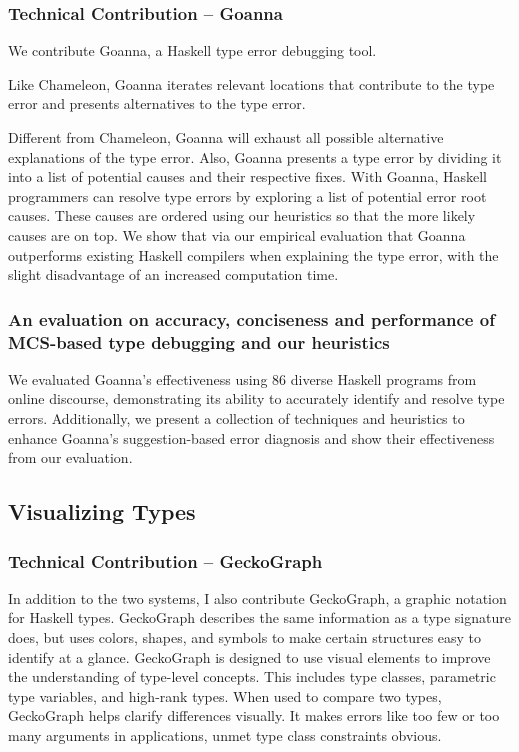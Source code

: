 \subsubsection{Technical Contribution -- Goanna}

We contribute Goanna, a Haskell type error debugging tool. 

Like Chameleon, Goanna iterates relevant locations that contribute to the type error and presents alternatives to the type error. 

Different from Chameleon, Goanna will exhaust all possible alternative explanations of the type error. Also, Goanna presents a type error by dividing it into a list of potential causes and their respective fixes. With Goanna, Haskell programmers can resolve type errors by exploring a list of potential error root causes. These causes are ordered using our heuristics so that the more likely causes are on top. We show that via our empirical evaluation that Goanna outperforms existing Haskell compilers when explaining the type error, with the slight disadvantage of an increased computation time.

\subsubsection{An evaluation on accuracy, conciseness and performance of MCS-based type debugging and our heuristics}

We evaluated Goanna's effectiveness using 86 diverse Haskell programs from online discourse, demonstrating its ability to accurately identify and resolve type errors. Additionally, we present a collection of techniques and heuristics to enhance Goanna's suggestion-based error diagnosis and show their effectiveness from our evaluation.


\subsection{Visualizing Types}

\subsubsection{Technical Contribution -- GeckoGraph}

In addition to the two systems, I also contribute GeckoGraph, a graphic notation for Haskell types. GeckoGraph describes the same information as a type signature does, but uses colors, shapes, and symbols to make certain structures easy to identify at a glance. GeckoGraph is designed to use visual elements to improve the understanding of type-level concepts. This includes type classes, parametric type variables, and high-rank types. When used to compare two types, GeckoGraph helps clarify differences visually. It makes errors like too few or too many arguments in applications, unmet type class constraints obvious.

